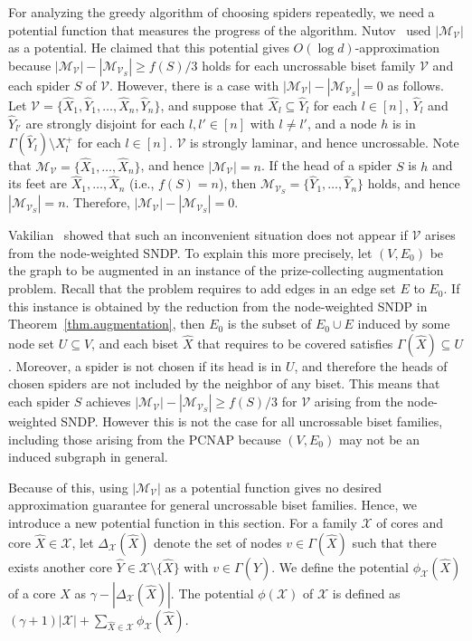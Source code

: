 \documentclass[11pt]{article}
\newcommand{\Mfam}{\mathcal{M}}
\newcommand{\Vfam}{\mathcal{V}}
\begin{document}
For analyzing the greedy algorithm of choosing spiders repeatedly, we need a potential function that
measures the progress of the algorithm. Nutov~\cite{Nutov12uncrossable} used $|\Mfam_{\Vfam}|$ as a
potential. He claimed that this potential gives $O(\log d)$-approximation  because
$|\Mfam_{\Vfam}|-|\Mfam_{\Vfam_S}| \geq f(S)/3$ holds for each uncrossable biset family $\Vfam$ and
each spider $S$ of $\Vfam$. However, there is a case with $|\Mfam_{\Vfam}|-|\Mfam_{\Vfam_S}|=0$ as
follows. Let $\Vfam=\{\hat{X}_1,\hat{Y}_1,\ldots,\hat{X}_n,\hat{Y}_n\}$, and suppose that 
$\hat{X}_l \subseteq \hat{Y}_l$ for each $l \in [n]$, $\hat{Y}_l$ and $\hat{Y}_{l'}$ are strongly disjoint for
each $l,l' \in [n]$ with $l\neq l'$, and a node $h$ is in $\Gamma(\hat{Y}_l) \setminus X^+_l$ for
each $l \in [n]$. $\Vfam$ is strongly laminar, and hence uncrossable. Note that
$\Mfam_{\Vfam}=\{\hat{X}_1,\ldots,\hat{X}_n\}$, and hence $|\Mfam_{\Vfam}|=n$. If the head of a
spider $S$ is $h$ and its feet are $\hat{X}_1,\ldots,\hat{X}_n$ (i.e., $f(S)=n$), then
$\Mfam_{\Vfam_S}=\{\hat{Y}_1,\ldots,\hat{Y}_n\}$ holds, and hence $|\Mfam_{\Vfam_S}|=n$. Therefore,
$|\Mfam_{\Vfam}|-|\Mfam_{\Vfam_S}|=0$.

Vakilian~\cite{Vakilian13} showed that such an inconvenient situation does not appear if $\Vfam$ arises from the
node-weighted SNDP. To explain this more precisely, let $(V,E_0)$ be the graph to be augmented in an
instance of the prize-collecting augmentation problem. Recall that the problem requires to add edges in an edge set $E$ to $E_0$. If this instance is obtained by the reduction from the
node-weighted SNDP in Theorem~\ref{thm.augmentation}, then $E_0$ is the subset of $E_0\cup E$ induced by some node set 
$U\subseteq V$, and each biset $\hat{X}$ that requires to be covered satisfies $\Gamma(\hat{X})\subseteq U$.
Moreover, a spider is not chosen if its head is in $U$, 
and therefore the heads of chosen spiders are not included by the neighbor
of any biset. This means that each spider $S$ achieves $|\Mfam_{\Vfam}|-|\Mfam_{\Vfam_S}| \geq f(S)/3$ for $\Vfam$ arising
from the node-weighted SNDP. However this is not the case for all uncrossable biset families, including those arising from 
the PCNAP because $(V,E_0)$ may not be an induced subgraph in general.

Because of this, using $|\Mfam_{\Vfam}|$ as a potential function gives no desired
approximation guarantee for general uncrossable biset families. Hence, we introduce a new potential function in this section. For a family
$\mathcal{X}$ of cores and core $\hat{X} \in \mathcal{X}$,  let $\Delta_{\mathcal{X}}(\hat{X})$
denote the set of nodes $v\in \Gamma(\hat{X})$ such that  there exists another core $\hat{Y} \in
\mathcal{X} \setminus \{\hat{X}\}$ with $v \in \Gamma(\hat{Y})$. We define the potential
$\phi_{\mathcal{X}}(\hat{X})$ of a core $\hat{X}$ as $\gamma-|\Delta_{\mathcal{X}}(\hat{X})|$. The
potential $\phi(\mathcal{X})$ of $\mathcal{X}$ is defined as 
$(\gamma+1)|\mathcal{X}|+\sum_{\hat{X} \in \mathcal{X}}\phi_{\mathcal{X}}(\hat{X})$.
\end{document}
